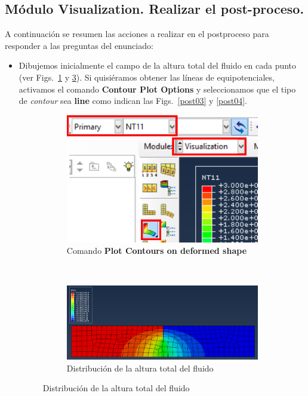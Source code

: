   \subsection{Módulo Visualization. Realizar el post-proceso.}
  A continuación se resumen las acciones a realizar en el postproceso
  para responder a las preguntas del enunciado:
  \begin{itemize}
  \item Dibujemos inicialmente el campo de la altura total del fluido
    en cada punto (ver Figs.~\ref{post01} y \ref{post02}). Si
    quisiéramos obtener las líneas de equipotenciales, activamos el
    comando \textbf{Contour Plot Options} y seleccionamos que el tipo
    de \textit{contour} sea \textbf{line} como indican las
    Figs.~\ref{post03} y \ref{post04}.

  \begin{figure}[!h]
    \centering
    \begin{subfigure}[!h]{0.21\textwidth}
      \includegraphics[width=\textwidth]{./body/images/post01.pdf}
      \caption{Comando \textbf{Plot Contours on deformed shape}}
      \label{post01}
    \end{subfigure}%
    ~ %
    \begin{subfigure}[!h]{0.60\textwidth}
      \includegraphics[width=\textwidth]{./body/images/post02}
      \caption{Distribución de la altura total del fluido}
      \label{post02}
    \end{subfigure}%


\end{figure}
\end{itemize}
